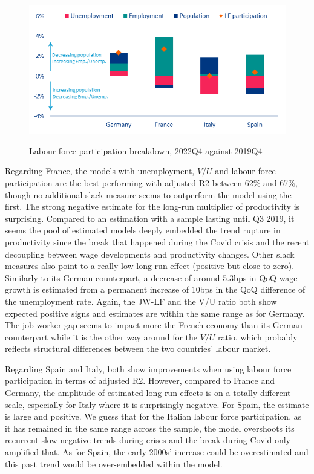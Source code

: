 \begin{figure}[H]
    \centering
    \caption{Labour force participation breakdown, 2022Q4 against 2019Q4}
    \includegraphics[width=.8\textwidth]{Core/2.Labour/img/lfpart breakdown.png}
    \label{figure:lfpart }
\end{figure}

Regarding France, the models with unemployment, $V/U$ and labour force participation are the best performing with adjusted R2 between 62\% and 67\%, though no additional slack measure seems to outperform the model using the first. 
The strong negative estimate for the long-run multiplier of productivity is surprising. 
Compared to an estimation with a sample lasting until Q3 2019, it seems the pool of estimated models deeply embedded the trend rupture in productivity since the break that happened during the Covid crisis and the recent decoupling between wage developments and productivity changes. 
Other slack measures also point to a really low long-run effect (positive but close to zero). 
Similarly to its German counterpart, a decrease of around 5.3bps in QoQ wage growth is estimated from a permanent increase of 10bps in the QoQ difference of the unemployment rate. 
Again, the JW-LF and the V/U ratio both show expected positive signs and estimates are within the same range as for Germany. 
The job-worker gap seems to impact more the French economy than its German counterpart while it is the other way around for the $V/U$ ratio, which probably reflects structural differences between the two countries’ labour market. 

Regarding Spain and Italy, both show improvements when using labour force participation in terms of adjusted R2. 
However, compared to France and Germany, the amplitude of estimated long-run effects is on a totally different scale, especially for Italy where it is surprisingly negative. 
For Spain, the estimate is large and positive. 
We guess that for the Italian labour force participation, as it has remained in the same range across the sample, the model overshoots its recurrent slow negative trends during crises and the break during Covid only amplified that. 
As for Spain, the early 2000s’ increase could be overestimated and this past trend would be over-embedded within the model. 

